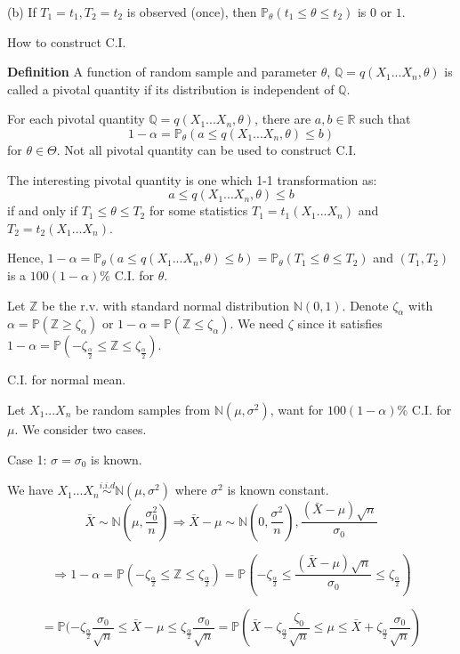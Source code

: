\documentclass[a4paper,12pt]{article}
\begin{document}
(b) If $T_1 = t_1, T_2 = t_2$ is observed (once),
 then $\mathbb{P}_\theta (t_1 \leq \theta \leq t_2)$ is $0$ or $1$.

How to construct C.I.

\textbf{Definition} A function of random sample and parameter $\theta$,
 $ \mathbb{Q} = q( X_1...X_n, \theta)$ is called a pivotal quantity if its distribution is independent of $\mathbb{Q}$.
 
For each pivotal quantity $\mathbb{Q} = q( X_1...X_n, \theta)$, 
there are $a, b \in \mathbb{R}$ such that $$ 1-\alpha = \mathbb{P}_\theta (a \leq q( X_1... X_n, \theta) \leq b)$$ for $\theta \in \Theta$. Not all pivotal quantity can be used to construct C.I.
 
The interesting pivotal quantity is one which 1-1 transformation as:
 $$a \leq q(X_1 ... X_n, \theta) \leq b$$ if and only if $T_1 \leq \theta \leq T_2$ 
 for some statistics $T_1 = t_1 (X_1 ... X_n)$ and $T_2 = t_2 (X_1 ... X_n)$.

Hence, $1 -\alpha = \mathbb{P}_\theta (a \leq q(X_1 ... X_n, \theta) \leq b) = \mathbb{P}_\theta (T_1 \leq \theta \leq T_2)$ and $(T_1, T_2)$ is a $100(1-\alpha)\%$ C.I. for $\theta$.

Let $\mathbb{Z}$ be the r.v. with standard normal distribution $\mathbb{N}(0,1)$.
Denote $\zeta_\alpha$ with $\alpha = \mathbb{P}(\mathbb{Z} \geq \zeta_\alpha)$ 
or $1-\alpha = \mathbb{P}(\mathbb{Z} \leq \zeta_\alpha)$. 
We need $\zeta$ since it satisfies $1-\alpha = \mathbb{P}(-\zeta_{\frac{\alpha}{2}}\leq \mathbb{Z} \leq \zeta_{\frac{\alpha}{2}})$.

C.I. for normal mean.

Let $X_1 ... X_n$ be random samples from $\mathbb{N}(\mu,\sigma^2)$, 
want for $100(1-\alpha)\%$ C.I. for $\mu$. We consider two cases.

Case 1: $\sigma = \sigma_0$ is known.

We have $X_1 ... X_n \overset{i.i.d}{\sim} \mathbb{N}(\mu, \sigma^2)$ where $\sigma^2$ is known constant.
$$\bar{X} \sim \mathbb{N}(\mu, \frac{\sigma_0^2}{n}) \Rightarrow 
\bar{X} - \mu \sim \mathbb{N}(0, \frac{\sigma^2}{n}), 
\frac{(\bar{X} - \mu) \sqrt{n}}{\sigma_0} $$

$$\Rightarrow 1-\alpha = \mathbb{P}(-\zeta_{\frac{\alpha}{2}} \leq \mathbb{Z} \leq \zeta_{\frac{\alpha}{2}})
= \mathbb{P}(-\zeta_{\frac{\alpha}{2}} \leq \frac{(\bar{X} - \mu) \sqrt{n}}{\sigma_0} \leq \zeta_{\frac{\alpha}{2}})$$


$$= \mathbb{P} (-\zeta_{\frac{\alpha}{2}} \frac{\sigma_0}{\sqrt{n}} \leq \bar{X} - \mu \leq \zeta_{\frac{\alpha}{2}} \frac{\sigma_0}{\sqrt{n}}
= \mathbb{P}(\bar{X} - \zeta_{\frac{\alpha}{2}} \frac{\zeta_0}{\sqrt{n}}
\leq \mu \leq \bar{X} + \zeta_{\frac{\alpha}{2}} \frac{\sigma_0}{\sqrt{n}})$$
\end{document}
